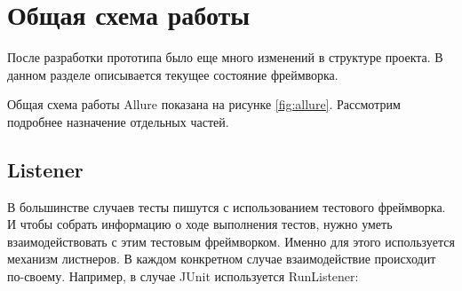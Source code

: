 \section{Общая схема работы} 

После разработки прототипа было еще много изменений в структуре проекта. В данном разделе описывается текущее состояние фреймворка.

Общая схема работы Allure показана на рисунке \ref{fig:allure}. Рассмотрим подробнее назначение отдельных частей.

\subsection{Listener}

В большинстве случаев тесты пишутся с использованием тестового фреймворка. И чтобы собрать информацию о ходе выполнения тестов, нужно уметь взаимодействовать с этим тестовым фреймворком. Именно для этого используется механизм листнеров. В каждом конкретном случае взаимодействие происходит по-своему. Например, в случае JUnit используется RunListener:


